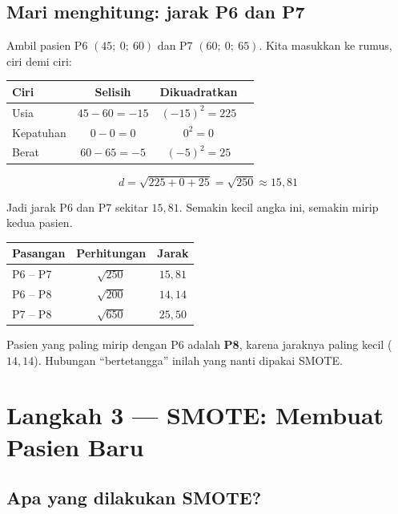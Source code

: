 \documentclass[11pt,a4paper]{article}
\begin{document}
\subsection{Mari menghitung: jarak P6 dan P7}

Ambil pasien P6 $(45;\ 0;\ 60)$ dan P7 $(60;\ 0;\ 65)$. Kita masukkan ke rumus, ciri demi ciri:

\begin{center}
\begin{tabular}{lccc}
\toprule
\textbf{Ciri} & \textbf{Selisih} & \textbf{Dikuadratkan} \\
\midrule
Usia      & $45 - 60 = -15$ & $(-15)^2 = 225$ \\
Kepatuhan & $0 - 0 = 0$     & $0^2 = 0$ \\
Berat     & $60 - 65 = -5$  & $(-5)^2 = 25$ \\
\bottomrule
\end{tabular}
\end{center}

\[
d = \sqrt{225 + 0 + 25} = \sqrt{250} \approx 15{,}81
\]

Jadi jarak P6 dan P7 sekitar $15{,}81$. Semakin kecil angka ini, semakin mirip kedua pasien.

\begin{center}
\begin{tabular}{lcc}
\toprule
\textbf{Pasangan} & \textbf{Perhitungan} & \textbf{Jarak} \\
\midrule
P6 -- P7 & $\sqrt{250}$ & $15{,}81$ \\
P6 -- P8 & $\sqrt{200}$ & $14{,}14$ \\
P7 -- P8 & $\sqrt{650}$ & $25{,}50$ \\
\bottomrule
\end{tabular}
\end{center}

\begin{hasil}
Pasien yang paling mirip dengan P6 adalah \textbf{P8}, karena jaraknya paling kecil
($14{,}14$). Hubungan ``bertetangga'' inilah yang nanti dipakai SMOTE.
\end{hasil}

\section{Langkah 3 --- SMOTE: Membuat Pasien Baru}

\subsection{Apa yang dilakukan SMOTE?}
\end{document}
